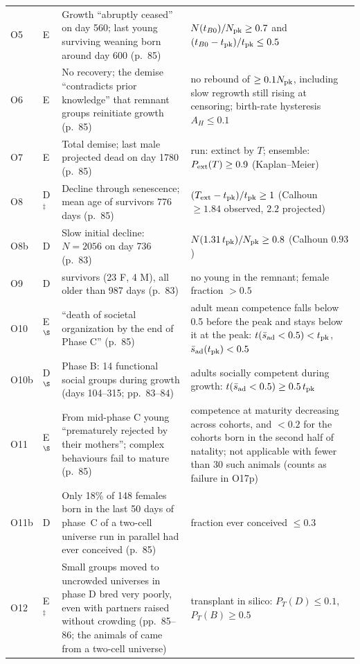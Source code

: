 \documentclass[preprint,12pt,authoryear]{elsarticle}
\begin{document}
{\begin{longtable}{@{}>{\raggedright\arraybackslash}p{}>{\raggedright\arraybackslash}p{}>{\raggedright\arraybackslash}p{}>{\raggedright\arraybackslash}p{}@{}}
O5 & E & Growth ``abruptly ceased'' on day 560; last young surviving weaning born around day 600 (p.~85) & $N(t_{B0})/N_{\rm pk}\ge 0.7$ and $(t_{B0}-t_{\rm pk})/t_{\rm pk}\le 0.5$ \\
O6 & E & No recovery; the demise ``contradicts prior knowledge'' that remnant groups reinitiate growth (p.~85) & no rebound of $\ge 0.1N_{\rm pk}$, including slow regrowth still rising at censoring; birth-rate hysteresis $A_H\le 0.1$ \\
O7 & E & Total demise; last male projected dead on day 1780 (p.~85) & run: extinct by $T$; ensemble: $P_{\rm ext}(T)\ge 0.9$ (Kaplan--Meier) \\
O8 & D$^\ddagger$ & Decline through senescence; mean age of survivors 776 days (p.~85) & $(T_{\rm ext}-t_{\rm pk})/t_{\rm pk}\ge 1$ (Calhoun $\ge 1.84$ observed, $2.2$ projected) \\
O8b & D & Slow initial decline: $N=2056$ on day 736 (p.~83) & $N(1.31\,t_{\rm pk})/N_{\rm pk}\ge 0.8$ (Calhoun $0.93$) \\
O9 & D & 27 survivors (23 F, 4 M), all older than 987 days (p.~83) & no young in the remnant; female fraction $>0.5$ \\
O10 & E$^\S$ & ``death of societal organization by the end of Phase C'' (p.~85) & adult mean competence falls below 0.5 before the peak and stays below it at the peak: $t(\bar s_{\rm ad}<0.5)<t_{\rm pk}$, $\bar s_{\rm ad}(t_{\rm pk})<0.5$ \\
O10b & D$^\S$ & Phase B: 14 functional social groups during growth (days 104--315; pp.~83--84) & adults socially competent during growth: $t(\bar s_{\rm ad}<0.5)\ge 0.5\,t_{\rm pk}$ \\
O11 & E$^\S$ & From mid-phase C young ``prematurely rejected by their mothers''; complex behaviours fail to mature (p.~85) & competence at maturity decreasing across cohorts, and $<0.2$ for the cohorts born in the second half of natality; not applicable with fewer than 30 such animals (counts as failure in O17p) \\
O11b & D & Only 18\% of 148 females born in the last 50 days of phase~C of a two-cell universe run in parallel had ever conceived (p.~85) & fraction ever conceived $\le 0.3$ \\
O12 & E$^\ddagger$ & Small groups moved to uncrowded universes in phase D bred very poorly, even with partners raised without crowding (pp.~85--86; the animals of \citealp{Marsden1972} came from a two-cell universe) & transplant in silico: $P_T(D)\le 0.1$, $P_T(B)\ge 0.5$ \\

\end{longtable}}
\end{document}

